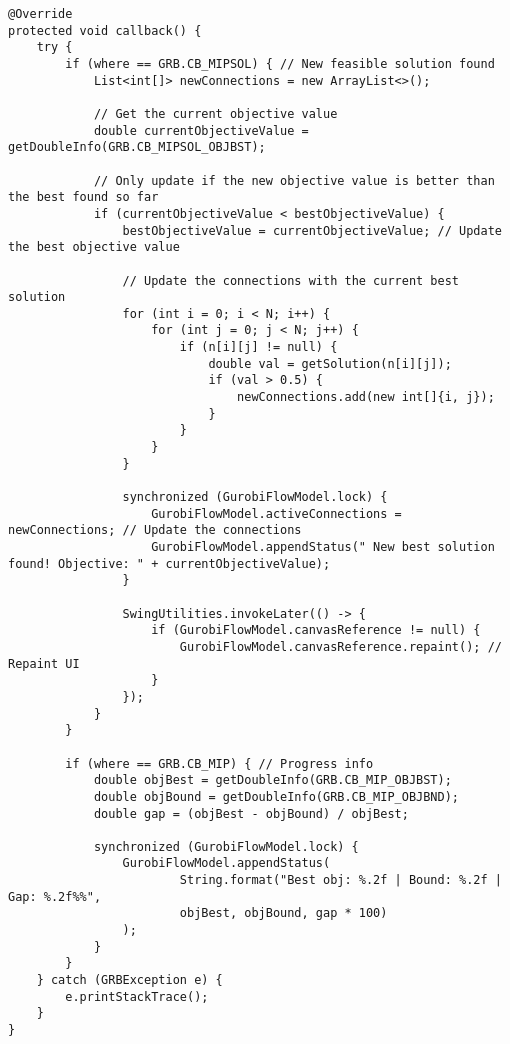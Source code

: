 \begin{lstlisting}
@Override
protected void callback() {
    try {
        if (where == GRB.CB_MIPSOL) { // New feasible solution found
            List<int[]> newConnections = new ArrayList<>();

            // Get the current objective value
            double currentObjectiveValue = getDoubleInfo(GRB.CB_MIPSOL_OBJBST);

            // Only update if the new objective value is better than the best found so far
            if (currentObjectiveValue < bestObjectiveValue) {
                bestObjectiveValue = currentObjectiveValue; // Update the best objective value

                // Update the connections with the current best solution
                for (int i = 0; i < N; i++) {
                    for (int j = 0; j < N; j++) {
                        if (n[i][j] != null) {
                            double val = getSolution(n[i][j]);
                            if (val > 0.5) {
                                newConnections.add(new int[]{i, j});
                            }
                        }
                    }
                }

                synchronized (GurobiFlowModel.lock) {
                    GurobiFlowModel.activeConnections = newConnections; // Update the connections
                    GurobiFlowModel.appendStatus(" New best solution found! Objective: " + currentObjectiveValue);
                }

                SwingUtilities.invokeLater(() -> {
                    if (GurobiFlowModel.canvasReference != null) {
                        GurobiFlowModel.canvasReference.repaint(); // Repaint UI
                    }
                });
            }
        }

        if (where == GRB.CB_MIP) { // Progress info
            double objBest = getDoubleInfo(GRB.CB_MIP_OBJBST);
            double objBound = getDoubleInfo(GRB.CB_MIP_OBJBND);
            double gap = (objBest - objBound) / objBest;

            synchronized (GurobiFlowModel.lock) {
                GurobiFlowModel.appendStatus(
                        String.format("Best obj: %.2f | Bound: %.2f | Gap: %.2f%%",
                        objBest, objBound, gap * 100)
                );
            }
        }
    } catch (GRBException e) {
        e.printStackTrace();
    }
}
\end{lstlisting}

